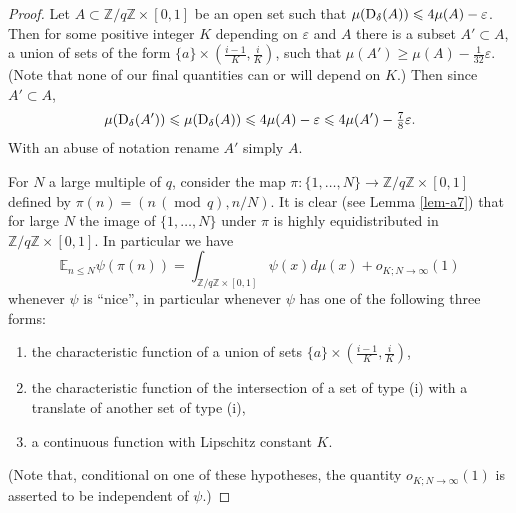 \documentclass[10pt,reqno]{amsart}
\theoremstyle{definition}
\theoremstyle{remark}
\newcommand{\md}[1]{\ensuremath{\,(\operatorname{mod}\, #1)}}
\renewcommand{\leq}{\leqslant}
\renewcommand{\geq}{\geqslant}
\def\Z{\mathbb{Z}}
\def\E{\mathbb{E}}
\def\eps{\varepsilon}
\numberwithin{equation}{section}
\begin{document}
\begin{proof}
Let $A \subset \Z/q\Z \times [0,1]$ be an open set such that $\mu(\Sym_{\delta}(A)) \leq 4 \mu(A) - \eps$. Then for some positive integer $K$ depending on $\eps$ and $A$ there is a subset $A'\subset A$, a union of sets of the form $\{a\} \times \left(\frac{i-1}{K}, \frac{i}{K}\right)$, such that $\mu(A')\geq\mu(A) - \frac{1}{32}\eps$. (Note that none of our final quantities can or will depend on $K$.) Then since $A'\subset A$, \[\mu(\Sym_\delta(A')) \leq \mu(\Sym_\delta(A)) \leq 4\mu(A) - \eps \leq 4\mu(A') - \tfrac{7}{8}\eps.\] With an abuse of notation rename $A'$ simply $A$.

For $N$ a large multiple of $q$, consider the map $\pi : \{1,\dots,N\} \rightarrow \Z/q\Z \times [0,1]$ defined by $\pi(n) = (n \md{q}, n/N)$. It is clear (see Lemma \ref{lem-a7}) that for large $N$ the image of $\{1,\dots,N\}$ under $\pi$ is highly equidistributed in $\Z/q\Z \times [0,1]$. In particular we have
\begin{equation}\label{equi}  \E_{n \leq N} \psi(\pi(n)) = \int_{\Z/q\Z \times [0,1]} \psi(x) d\mu(x) + o_{K; N \rightarrow \infty}(1)\end{equation} whenever $\psi$ is ``nice'', in particular whenever $\psi$ has one of the following three forms:
\begin{enumerate}
\item the characteristic function of a union of sets $\{a\} \times \left(\frac{i-1}{K}, \frac{i}{K}\right)$,
\item the characteristic function of the intersection of a set of type (i) with a translate of another set of type (i),
\item a continuous function with Lipschitz constant $K$.
\end{enumerate}
(Note that, conditional on one of these hypotheses, the quantity $o_{K; N \rightarrow \infty}(1)$ is asserted to be independent of $\psi$.)


\end{proof}
\end{document}
